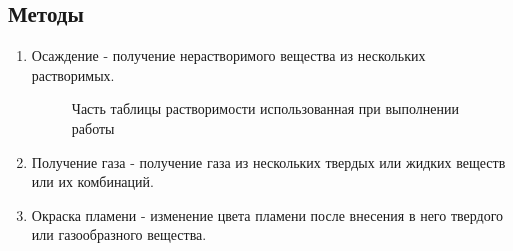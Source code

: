 \documentclass[a4paper,14pt,titlepage,twoside]{article}
\begin{document}
        \subsection{Методы}
            \begin{enumerate}
                \item
                    Осаждение - получение нерастворимого вещества из нескольких 
                    растворимых.

                    \begin{figure}[h]
                        \caption{Часть таблицы растворимости использованная при выполнении работы}
                    \end{figure}
            
                \newpage    
                \item
                    Получение газа - получение газа из нескольких твердых или жидких
                    веществ или их комбинаций.

                \item 
                    Окраска пламени - изменение цвета пламени после внесения в него
                    твердого или газообразного вещества.\\


\end{enumerate}
\end{document}
